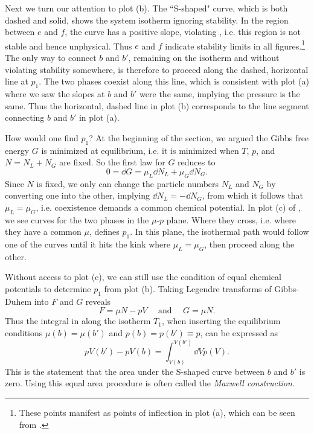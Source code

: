 Next we turn our attention to plot (b). The ``S-shaped" curve, which is both
dashed and solid, shows the system isotherm ignoring stability. In the region
between $e$ and $f$, the curve has a positive slope, violating
, i.e. this region is not stable and hence unphysical.
Thus $e$ and $f$ indicate stability limits in all figures.\footnote{These points
manifest as points of inflection in plot (a), which can be seen from
.}
The only way to connect $b$ and $b'$, remaining on the isotherm and
without violating stability somewhere, is
therefore to proceed along the dashed, horizontal line at $p_1$. 
The two phases coexist
along this line, which is consistent with plot (a) where we saw the slopes at
$b$ and $b'$ were the same, implying the pressure is the same. Thus the
horizontal, dashed line in plot (b) corresponds to the line segment connecting
$b$ and $b'$ in plot (a).

How would one find $p_1$? At the beginning of the section, we argued the Gibbs free
energy $G$ is minimized at equilibrium, i.e. it is minimized when $T$, $p$,
and $N=N_L+N_G$ are fixed. So the first law for $G$ reduces to
\begin{equation}
0=\dd{G}=\mu_L\dd{N_L}+\mu_G\dd{N_G}.
\end{equation}
Since $N$ is fixed, we only can change the particle numbers $N_L$ and $N_G$ by
converting one into the other, implying $\dd{N_L}=-\dd{N_G}$, from which it
follows that $\mu_L=\mu_G$, i.e. coexistence demands a common chemical
potential. In plot (c) of , we see curves for the two
phases in the $\mu$-$p$ plane. Where they cross, i.e. where they have a common
$\mu$, defines $p_1$. In this plane, the isothermal path would follow one
of the curves until it hits the kink where $\mu_L=\mu_G$, then proceed
along the other.

Without access to plot (c), we can still use the condition of equal chemical
potentials to determine $p_1$ from plot (b). Taking Legendre transforms of
Gibbs-Duhem into $F$ and $G$ reveals 
\begin{equation}\label{eq:GibbsDuhemFG}
F=\mu N-pV ~~~~~~\text{and}~~~~~~G=\mu N.
\end{equation}
Thus the integral in  along the isotherm $T_1$, when 
inserting the equilibrium conditions $\mu(b)=\mu(b')$ and $p(b)=p(b')\equiv p$,
can be expressed as
\begin{equation}
pV(b')-pV(b)=\int_{V(b)}^{V(b')}\dd{V}p(V).
\end{equation}
This is the statement that the area under the S-shaped curve between $b$ and
$b'$ is zero. Using this equal area procedure is often called the {\it Maxwell
construction}.

